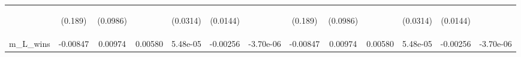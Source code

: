 \documentclass[]{article}
\begin{document}
\begin{center}
\begin{tabular}{lcccccccccccc}
\vspace{4pt} & \begin{footnotesize}(0.189)\end{footnotesize} & \begin{footnotesize}(0.0986)\end{footnotesize} & \begin{footnotesize}\end{footnotesize} & \begin{footnotesize}(0.0314)\end{footnotesize} & \begin{footnotesize}(0.0144)\end{footnotesize} & \begin{footnotesize}\end{footnotesize} & \begin{footnotesize}(0.189)\end{footnotesize} & \begin{footnotesize}(0.0986)\end{footnotesize} & \begin{footnotesize}\end{footnotesize} & \begin{footnotesize}(0.0314)\end{footnotesize} & \begin{footnotesize}(0.0144)\end{footnotesize} & \begin{footnotesize}\end{footnotesize} \\
m\_L\_wins & -0.00847 & 0.00974 & 0.00580 & 5.48e-05 & -0.00256 & -3.70e-06 & -0.00847 & 0.00974 & 0.00580 & 5.48e-05 & -0.00256 & -3.70e-06 \\

\end{tabular}
\end{center}
\end{document}
